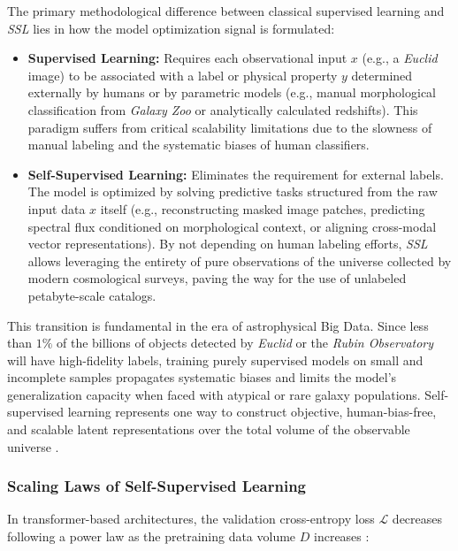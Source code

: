 The primary methodological difference between classical supervised learning and \textit{\gls{SSL}} lies in how the model optimization signal is formulated:

\begin{itemize}
  \item \textbf{Supervised Learning:} Requires each observational input $x$ (e.g., a \textit{Euclid} image) to be associated with a label or physical property $y$ determined externally by humans or by parametric models (e.g., manual morphological classification from \textit{Galaxy Zoo} or analytically calculated redshifts). This paradigm suffers from critical scalability limitations due to the slowness of manual labeling and the systematic biases of human classifiers.
  
  \item \textbf{Self-Supervised Learning:} Eliminates the requirement for external labels. The model is optimized by solving predictive tasks structured from the raw input data $x$ itself (e.g., reconstructing masked image patches, predicting spectral flux conditioned on morphological context, or aligning cross-modal vector representations). By not depending on human labeling efforts, \textit{\gls{SSL}} allows leveraging the entirety of pure observations of the universe collected by modern cosmological surveys, paving the way for the use of unlabeled petabyte-scale catalogs.
\end{itemize}

This transition is fundamental in the era of astrophysical Big Data. Since less than $1\%$ of the billions of objects detected by \textit{Euclid} or the \textit{Rubin Observatory} will have high-fidelity labels, training purely supervised models on small and incomplete samples propagates systematic biases and limits the model's generalization capacity when faced with atypical or rare galaxy populations. Self-supervised learning represents one way to construct objective, human-bias-free, and scalable latent representations over the total volume of the observable universe \autocites{ar:huertas-company-lanusse-2023}{ar:hayat-2021}{ar:sarmiento-2021}.

\subsubsection{Scaling Laws of Self-Supervised Learning}

In transformer-based architectures, the validation cross-entropy loss $\mathcal{L}$ decreases following a power law as the pretraining data volume $D$ increases \autocite{ar:kaplan-2020}:

